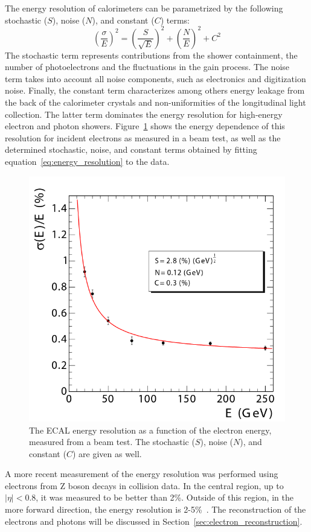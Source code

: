 The energy resolution of calorimeters can be parametrized by the following stochastic ($S$), noise ($N$), and constant ($C$) terms:
\begin{equation}
\label{eq:energy_resolution}
 \left(\frac{\sigma}{E}\right)^2 = \left(\frac{S}{\sqrt{E}}\right)^2 + \left(\frac{N}E{}\right)^2 + C^2
\end{equation}
The stochastic term represents contributions from the shower containment, the number of photoelectrons and the fluctuations in the gain process.  The noise term takes into account all noise components, such as electronics and digitization noise. Finally, the constant term characterizes among others energy leakage from the back of the calorimeter crystals and non-uniformities of the longitudinal light collection. The latter term dominates the energy resolution for high-energy electron and photon showers. Figure~\ref{fig:ecal_res} shows the energy dependence of this resolution for incident electrons as measured in a beam test, as well as the determined stochastic, noise, and constant terms obtained by fitting  equation~\ref{eq:energy_resolution} to the data.

\begin{figure}[ht]
 \centering
 \includegraphics[width = .6\textwidth]{ecal_res}
\caption{The \ac{ECAL} energy resolution as a function of the electron energy, measured from a beam test. The stochastic ($S$), noise ($N$), and constant ($C$) are given as well.}
\label{fig:ecal_res}
\end{figure}

A more recent measurement of the energy resolution was performed using electrons from Z boson decays in collision data. In the central region, up to $|\eta| < 0.8$, it was measured to be better than 2\%. Outside of this region, in the more forward direction, the energy resolution is 2-5\%~\cite{Chatrchyan:2013dga}. The reconstruction of the electrons and photons will be discussed in Section~\ref{sec:electron_reconstruction}.

